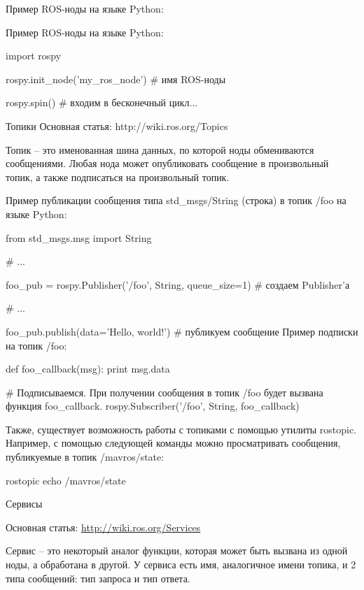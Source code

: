 Пример ROS-ноды на языке Python:


\begin{Program}[H]
	\caption{Пример ROS-ноды на языке Python:} \label{lst:1}
	\begin{MyCode}
import rospy

rospy.init_node('my_ros_node')  # имя ROS-ноды

rospy.spin()  # входим в бесконечный цикл...
	\end{MyCode}
\end{Program}
Топики
Основная статья: http://wiki.ros.org/Topics

Топик – это именованная шина данных, по которой ноды обмениваются сообщениями. Любая нода может опубликовать сообщение в произвольный топик, а также подписаться на произвольный топик.

\begin{Program}[H]
	\caption{Пример публикации сообщения типа std\_msgs/String (строка) в топик /foo на языке Python:} \label{lst:1}
	\begin{MyCode}
from std_msgs.msg import String

# ...

foo_pub = rospy.Publisher('/foo', String, queue_size=1)  # создаем Publisher'а

# ...

foo_pub.publish(data='Hello, world!')  # публикуем сообщение
Пример подписки на топик /foo:

def foo_callback(msg):
print msg.data

# Подписываемся. При получении сообщения в топик /foo будет вызвана функция foo_callback.
rospy.Subscriber('/foo', String, foo_callback)
	\end{MyCode}
\end{Program}

Также, существует возможность работы с топиками с помощью утилиты rostopic. Например, с помощью следующей команды можно просматривать сообщения, публикуемые в топик /mavros/state:

rostopic echo /mavros/state

Сервисы

Основная статья: \url{http://wiki.ros.org/Services}

Сервис – это некоторый аналог функции, которая может быть вызвана из одной ноды, а обработана в другой. У сервиса есть имя, аналогичное имени топика, и 2 типа сообщений: тип запроса и тип ответа.

